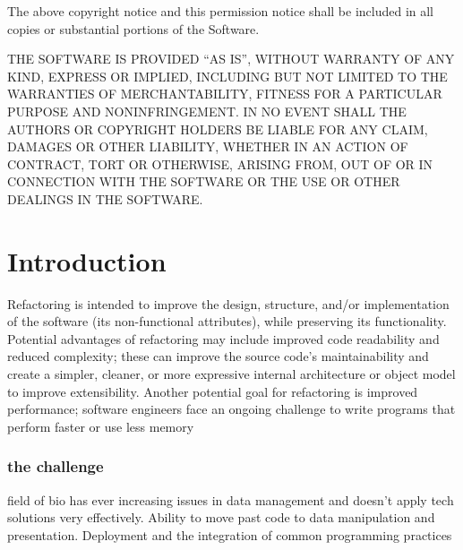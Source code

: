 \documentclass[10pt]{report}
\begin{document}
The above copyright notice and this permission notice shall be included in all copies or substantial portions of the Software.

THE SOFTWARE IS PROVIDED ``AS IS'', WITHOUT WARRANTY OF ANY KIND, EXPRESS OR IMPLIED, INCLUDING BUT NOT LIMITED TO THE WARRANTIES OF MERCHANTABILITY, FITNESS FOR A PARTICULAR PURPOSE AND NONINFRINGEMENT\@. IN NO EVENT SHALL THE AUTHORS OR COPYRIGHT HOLDERS BE LIABLE FOR ANY CLAIM, DAMAGES OR OTHER LIABILITY, WHETHER IN AN ACTION OF CONTRACT, TORT OR OTHERWISE, ARISING FROM, OUT OF OR IN CONNECTION WITH THE SOFTWARE OR THE USE OR OTHER DEALINGS IN THE SOFTWARE\@.

{}
%
%
%
%
%

\tableofcontents
{}
\listoftables
{}
\listoffigures

\newpage






\chapter{Introduction}
Refactoring is intended to improve the design, structure, and/or implementation of the software (its non-functional attributes), while preserving its functionality. Potential advantages of refactoring may include improved code readability and reduced complexity; these can improve the source code's maintainability and create a simpler, cleaner, or more expressive internal architecture or object model to improve extensibility. Another potential goal for refactoring is improved performance; software engineers face an ongoing challenge to write programs that perform faster or use less memory\cite{Kerievsky2004}

\subsection{the challenge}

field of bio has ever increasing issues in data management and doesn't apply tech solutions very effectively. Ability to move past code to data manipulation and presentation. Deployment and the integration of common programming practices
\end{document}
